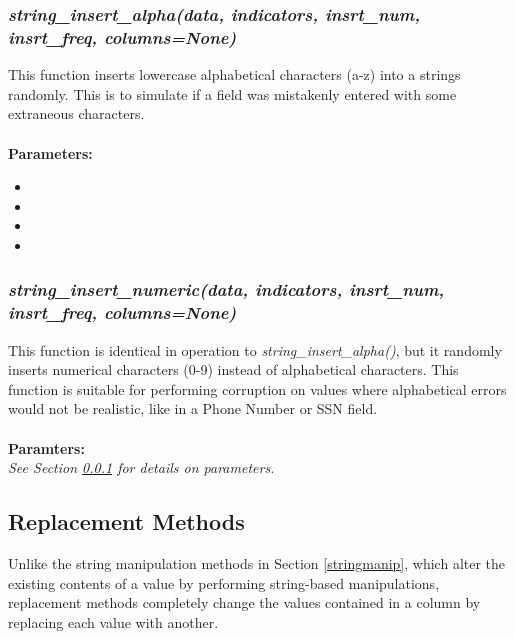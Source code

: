 \documentclass[titlepage, 11pt]{article}
\begin{document}
\subsubsection{\textit{string\_insert\_alpha(data, indicators, insrt\_num, insrt\_freq, columns=None)}}\label{stinsert}

This function inserts lowercase alphabetical characters (a-z) into a strings randomly. This is to simulate if a field was mistakenly entered with some extraneous characters. 
\\
\\
\textbf{Parameters:}
\begin{itemize}
    \item \docdata
    \item \docindc
    \item {}
    \item {}
\end{itemize}

\subsubsection{\textit{string\_insert\_numeric(data, indicators, insrt\_num, insrt\_freq, columns=None)}}
This function is identical in operation to \textit{string\_insert\_alpha()}, but it randomly inserts numerical characters (0-9) instead of alphabetical characters. This function is suitable for performing corruption on values where alphabetical errors would not be realistic, like in a Phone Number or SSN field.
\\
\\
\textbf{Paramters:}
\\
\textit{See Section \ref{stinsert} for details on parameters.}

\subsection{Replacement Methods}
Unlike the string manipulation methods in Section \ref{stringmanip}, which alter the existing contents of a value by performing string-based manipulations, replacement methods completely change the values contained in a column by replacing each value with another.
\end{document}

